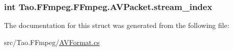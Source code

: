 \label{struct_tao_1_1_f_fmpeg_1_1_f_fmpeg_1_1_a_v_packet_a48d7ba4dde657a9a9a6b87b076412442}
\hypertarget{struct_tao_1_1_f_fmpeg_1_1_f_fmpeg_1_1_a_v_packet_ac3e1eb9918e273ec13f410fa9967d266}{
\subsubsection[{stream\_\-index}]{\setlength{\rightskip}{0pt plus 5cm}int {\bf Tao.FFmpeg.FFmpeg.AVPacket.stream\_\-index}}}
\label{struct_tao_1_1_f_fmpeg_1_1_f_fmpeg_1_1_a_v_packet_ac3e1eb9918e273ec13f410fa9967d266}


The documentation for this struct was generated from the following file:\begin{DoxyCompactItemize}
\item 
src/Tao.FFmpeg/\hyperlink{_a_v_format_8cs}{AVFormat.cs}\end{DoxyCompactItemize}
